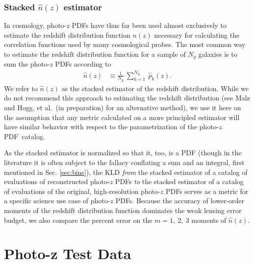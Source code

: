 \documentclass[\docopts]{\docclass}
\newcommand{\pz}{photo-$z$ PDF}
\begin{document}
\subsubsection{Stacked $\hat{n}(z)$ estimator}
\label{sec:stacked_metric}

In cosmology, \pz s have thus far been used almost exclusively to estimate the 
redshift distribution function $n(z)$ necessary for calculating the correlation 
functions used by many cosmological probes.
The most common way to estimate the redshift distribution function for a sample 
of $N_{g}$ galaxies is to sum the \pz s according to
\begin{align}
  \label{eq:nz}
  \hat{n}(z) &\equiv \frac{1}{N_{g}}\ \sum_{k=1}^{N_{g}}\ \hat{p}_{k}(z).
\end{align}
We refer to $\hat{n}(z)$ as the stacked estimator of the redshift distribution.
While we do not recommend this approach to estimating the redshift distribution 
(see Malz and Hogg, et al.\ (in preparation) for an alternative method), we use 
it here on the assumption that any metric calculated on a more principled 
estimator will have similar behavior with respect to the parametrization of the 
\pz\ catalog.

As the stacked estimator is normalized so that it, too, is a PDF (though in the 
literature it is often subject to the fallacy conflating a sum and an integral, 
first mentioned in Sec. \ref{sec:bins}), the KLD \textit{from} the stacked 
estimator of a catalog of evaluations of reconstructed \pz s \textit{to} the 
stacked estimator of a catalog of evaluations of the original, high-resolution 
\pz s serves as a metric for a specific science use case of \pz s.
Because the accuracy of lower-order moments of the redshift distribution 
function dominates the weak lensing error budget, we also compare the percent 
error on the $m=1,\ 2,\ 3$ moments of $\hat{n}(z)$.


\section{Photo-z Test Data}
\label{sec:data}
\end{document}
